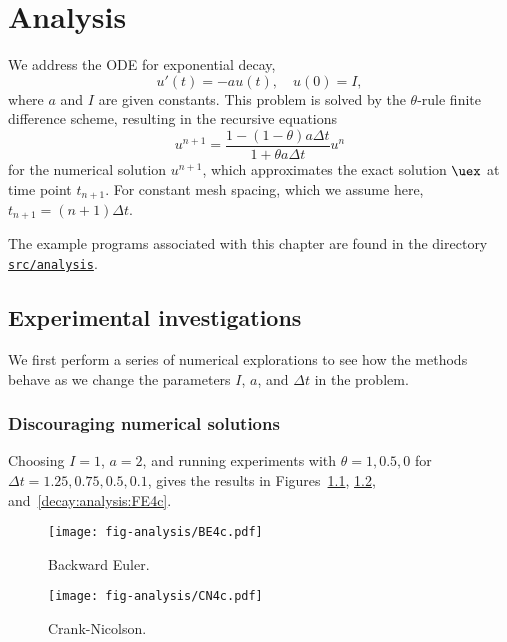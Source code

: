 \documentclass[graybox,sectrefs,envcountresetchap,open=right,final]{svmonodo}
\begin{document}
\chapter{Analysis}
\label{decay:analysis}



We address the ODE for exponential decay,
\begin{equation}
u'(t) = -au(t),\quad u(0)=I,
\end{equation}
where $a$ and $I$ are given constants. This problem is solved
by the $\theta$-rule finite difference scheme, resulting in
the recursive equations
\begin{equation}
u^{n+1} = \frac{1 - (1-\theta) a\Delta t}{1 + \theta a\Delta t}u^n
\label{decay:analysis:scheme}
\end{equation}
for the numerical solution $u^{n+1}$, which approximates the exact
solution $\uex$ at time point $t_{n+1}$. For constant mesh spacing,
which we assume here, $t_{n+1}=(n+1)\Delta t$.

The example programs associated with this chapter are found in
the directory \href{{http://tinyurl.com/ofkw6kc/analysis}}{\nolinkurl{src/analysis}}.

\section{Experimental investigations}

We first perform a series of numerical explorations to see how the
methods behave as we change the parameters $I$, $a$, and $\Delta t$
in the problem.

\subsection{Discouraging numerical solutions}

Choosing $I=1$, $a=2$, and running experiments with $\theta =1,0.5, 0$
for $\Delta t=1.25, 0.75, 0.5, 0.1$, gives the results in
Figures~\ref{decay:analysis:BE4c}, \ref{decay:analysis:CN4c}, and~\ref{decay:analysis:FE4c}.


\begin{figure}[!ht]  %
  \centerline{\texttt{[image: fig-analysis/BE4c.pdf]}}
  \caption{
  Backward Euler. \label{decay:analysis:BE4c}
  }
\end{figure}



\begin{figure}[!ht]  %
  \centerline{\texttt{[image: fig-analysis/CN4c.pdf]}}
  \caption{
  Crank-Nicolson. \label{decay:analysis:CN4c}
  }
\end{figure}
\end{document}
